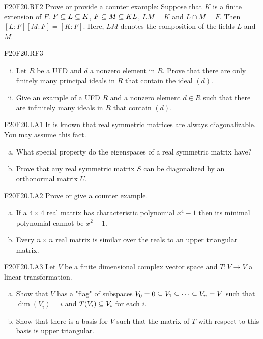 \documentclass[../AlgebraQualSolutions.tex]{subfiles}
\begin{document}
\begin{prob}{F20}{F20.RF2}
Prove or provide a counter example: Suppose that $K$ is a finite extension of $F$. $F \subseteq L \subseteq K$, $F \subseteq M \subseteq KL$, $LM = K$ and $L \cap M = F$. Then $[L:F][M:F] = [K:F]$. Here, $LM$ denotes the composition of the fields $L$ and $M$.
\end{prob}

\begin{prob}{F20}{F20.RF3}
	\begin{enumerate}[(i)]
	\item Let $R$ be a UFD and $d$ a nonzero element in $R$. Prove that there are only finitely many principal ideals  in $R$ that contain the ideal $(d)$.
	\item Give an example of a UFD $R$ and a nonzero element $d \in R$ such that there are infinitely many ideals in $R$ that contain $(d)$.
	\end{enumerate}
\end{prob}

\begin{prob}{F20}{F20.LA1}
It is known that real symmetric matrices are always diagonalizable. You may assume this fact.
\begin{enumerate}[(a)]
\item What special property do the eigenspaces of a real symmetric matrix have?
\item Prove that any real symmetric matrix $S$ can be diagonalized by an orthonormal matrix $U$.
\end{enumerate}
\end{prob}

\begin{prob}{F20}{F20.LA2}
Prove or give a counter example.
\begin{enumerate}[(a)]
\item If a $4 \times 4$ real matrix has characteristic polynomial $x^4 -1$ then its minimal polynomial cannot be $x^2 - 1$.
\item Every $n \times n$ real matrix is similar over the reals to an upper triangular matrix.
\end{enumerate}
\end{prob}

\begin{prob}{F20}{F20.LA3}
Let $V$ be a finite dimensional complex vector space and $T: V \to V$ a linear transformation.
\begin{enumerate}[(a)]
\item Show that $V$ has a "flag" of subspaces $V_0 = 0 \subseteq V_1 \subseteq \cdots \subseteq V_n = V$ such that $\dim(V_i) = i$ and $T(V_i) \subseteq V_i$ for each $i$.
\item Show that there is a basis for $V$ such that the matrix of $T$ with respect to this basis is upper triangular.
\end{enumerate}
\end{prob}
\end{document}
